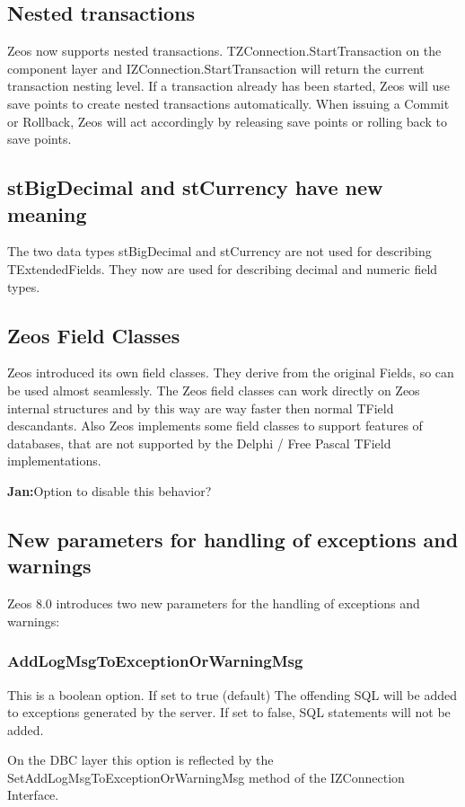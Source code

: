 \documentclass[a4paper,12pt,oneside]{article}
\begin{document}
\subsection{Nested transactions}
Zeos now supports nested transactions. TZConnection.StartTransaction on the component layer and IZConnection.StartTransaction will return the current transaction nesting level.
If a transaction already has been started, Zeos will use save points to create nested transactions automatically.
When issuing a Commit or Rollback, Zeos will act accordingly by releasing save points or rolling back to save points.

\subsection{stBigDecimal and stCurrency have new meaning}
The two data types stBigDecimal and stCurrency are not used for describing TExtendedFields.
They now are used for describing decimal and numeric field types.

\subsection{Zeos Field Classes}
Zeos introduced its own field classes.
They derive from the original Fields, so can be used almost seamlessly.
The Zeos field classes can work directly on Zeos internal structures and by this way are way faster then normal TField descandants.
Also Zeos implements some field classes to support features of databases, that are not supported by the Delphi / Free Pascal TField implementations.

\textbf{Jan:}Option to disable this behavior?

\subsection{New parameters for handling of exceptions and warnings}
Zeos 8.0 introduces two new parameters for the handling of exceptions and warnings:

\subsubsection{AddLogMsgToExceptionOrWarningMsg }
This is a boolean option.
If set to true (default) The offending SQL will be added to exceptions generated by the server.
If set to false, SQL statements will not be added.

On the DBC layer this option is reflected by the SetAddLogMsgToExceptionOrWarningMsg method of the IZConnection Interface.
\end{document}
